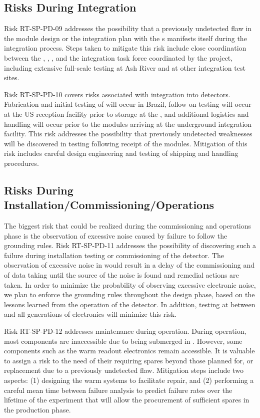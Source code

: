 \subsection{Risks During Integration}

Risk RT-SP-PD-09 addresses the possibility that a previously undetected flaw in the  module design or the integration plan with the s manifests itself during the integration process.  Steps taken to mitigate this risk include close coordination between the , , , and the integration task force coordinated by the project, including extensive full-scale testing at Ash River and at other integration test sites.

Risk RT-SP-PD-10 covers risks associated with integration into  detectors.  Fabrication and initial testing of  will occur in Brazil, follow-on testing will occur at the US reception facility prior to storage at the , and additional logistics and handling will occur prior to the modules arriving at the underground integration facility. This risk addresses the possibility that previously undetected weaknesses will be discovered in  testing following receipt of the modules.  Mitigation of this risk includes careful design engineering and testing of shipping and handling procedures.


\subsection{Risks During Installation/Commissioning/Operations}

The biggest risk that could be realized during the commissioning and operations phase is
the observation of excessive noise caused by failure to follow the 
grounding rules.  Risk RT-SP-PD-11 addresses the possibility of discovering such a failure during installation  testing or commissioning of the detector.  The observation of excessive noise in 
would result in a delay of the commissioning and of data taking until the source of the noise is
found and remedial actions are taken. In order to minimize the probability of observing excessive
electronic noise, we plan to enforce the grounding rules throughout the design phase, based on
the lessons learned from the operation of the  detector.  In addition, testing at  between  and all generations of  electronics will minimize this risk.  

Risk RT-SP-PD-12 addresses  maintenance during operation.   During operation, most  components are inaccessible due to being submerged in .  However, some components such as the warm readout electronics remain accessible. It is valuable to assign a risk to the need of their requiring spares beyond those planned for, or replacement due to a previously undetected flaw.  
Mitigation steps include two aspects: (1) designing the warm systems to facilitate repair, and (2) performing a careful mean time between failure analysis to predict failure rates over the lifetime of the experiment that will allow the procurement of sufficient spares in the production phase. 